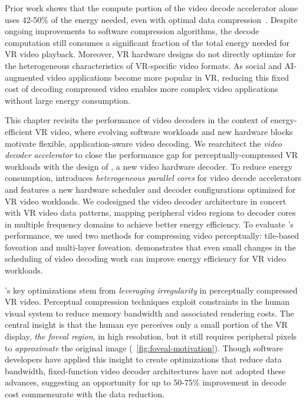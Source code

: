 Prior work shows that the compute portion of the video decode accelerator alone uses 42-50\% of the energy needed, even with optimal data compression~\cite{google2018asplos, tikekar18ijssc, 8khevc-ijssc}.
Despite ongoing improvements to software compression algorithms, the decode computation still consumes a significant fraction of the total energy needed for VR video playback.
Moreover, VR hardware designs do not directly optimize for the heterogeneous characteristics of VR-specific video formats.
As social and AI-augmented video applications become more popular in VR, reducing this fixed cost of decoding compressed video enables more complex video applications without large energy consumption.

This chapter revisits the performance of video decoders in the context of energy-efficient VR video, where evolving software workloads and new hardware blocks motivate flexible, application-aware video decoding.
We rearchitect the \emph{video decoder accelerator} to close the performance gap for perceptually-compressed VR workloads with the design of \nameArch, a new video hardware decoder.
To reduce energy consumption, \nameArch introduces \emph{heterogeneous parallel cores} for video decode accelerators and features a new hardware scheduler and decoder configurations optimized for VR video workloads.
We codesigned the video decoder architecture in concert with VR video data patterns, mapping peripheral video regions to decoder cores in multiple frequency domains to achieve better energy efficiency.
To evaluate \nameArch's performance, we used two methods for compressing video perceptually: tile-based foveation and multi-layer foveation.
\nameArch demonstrates that even small changes in the scheduling of video decoding work can improve energy efficiency for VR video workloads.

\nameArch's key optimizations stem from \emph{leveraging irregularity} in perceptually compressed VR video.
Perceptual compression techniques exploit constraints in the human visual system to reduce memory bandwidth and associated rendering costs.
The central insight is that the human eye perceives only a small portion of the VR display, \emph{the foveal region}, in high resolution, but it still requires peripheral pixels to \emph{approximate} the original image (~\ref{fig:foveal-motivation}).
Though software developers have applied this insight to create optimizations that reduce data bandwidth, fixed-function video decoder architectures have not adopted these advances, suggesting an opportunity for up to 50-75\% improvement in decode cost commensurate with the data reduction.

